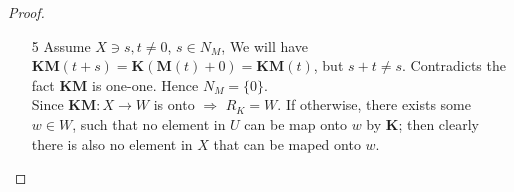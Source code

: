 \documentclass[a4paper, 10pt]{article}
\theoremstyle{definition}
\theoremstyle{hSol}
\begin{document}
\begin{proof}
\begin{itemize}
  \textit{Claim}: $\bm{M}^{-1}\bm{K}^{-1}$ is a linear map, and $\bm{M}^{-1}\bm{K}^{-1} \bm{KM}=\bm{KM}\bm{M}^{-1}\bm{K}^{-1}=\bm{I}$.\\
  \textit{Proof of Claim}: Linearity is due to exercise 1. And
  \begin{equation}
    \begin{split}
      (\bm{M}^{-1}\bm{K}^{-1}\bm{KM})(x) &= \bm{M}^{-1}(\bm{K}^{-1}(\bm{K}(\bm{M}(x))))\\
      &= \bm{M}^{-1}(\bm{I}(\bm{M}(x)))\\
      &= (\bm{M}^{-1}\bm{M})(x) = \bm{I}
    \end{split}
  \end{equation}
  We proceed the same way for $\bm{KM}\bm{M}^{-1}\bm{K}^{-1}$.
  \item[5] Assume $X \ni s,t \ne 0$, $s\in N_M$, We will have $\bm{KM}(t+s)=\bm{K}(\bm{M}(t)+0)=\bm{KM}(t)$, but $s+t\ne s$. Contradicts the fact $\bm{KM}$ is one-one. Hence $N_M = \{0\}$.\\
  Since $\bm{KM}: X\to W$ is onto $\Rightarrow$ $R_K = W$. If otherwise, there exists some $w\in W$, such that no element in $U$ can be map onto $w$ by $\bm{K}$; then clearly there is also no element in $X$ that can be maped onto $w$.
\end{itemize}
\end{proof} 
\end{document}
